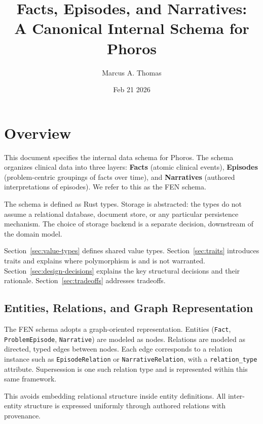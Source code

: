 \documentclass[11pt]{article}
\title{Facts, Episodes, and Narratives:\\
A Canonical Internal Schema for Phoros}
\author{Marcus A. Thomas}
\date{Feb 21 2026}
\begin{document}
\maketitle

\section{Overview}

This document specifies the internal data schema for Phoros. The schema
organizes clinical data into three layers: \textbf{Facts} (atomic clinical
events), \textbf{Episodes} (problem-centric groupings of facts over time),
and \textbf{Narratives} (authored interpretations of episodes). We refer to
this as the FEN schema.

The schema is defined as Rust types. Storage is abstracted: the types do not
assume a relational database, document store, or any particular persistence
mechanism. The choice of storage backend is a separate decision, downstream
of the domain model.

Section~\ref{sec:value-types}
defines shared value types. Section~\ref{sec:traits} introduces traits and
explains where polymorphism is and is not warranted.
Section~\ref{sec:design-decisions} explains the key structural decisions and
their rationale. Section~\ref{sec:tradeoffs} addresses tradeoffs.

\subsection{Entities, Relations, and Graph Representation}

The FEN schema adopts a graph-oriented representation. Entities (\texttt{Fact}, \texttt{ProblemEpisode}, \texttt{Narrative}) are
modeled as nodes. Relations are modeled as directed, typed edges
between nodes. Each edge corresponds to a relation instance such as
\texttt{EpisodeRelation} or \texttt{NarrativeRelation}, with a
\texttt{relation\_type} attribute. Supersession is one such relation
type and is represented within this same framework.

This avoids embedding relational structure inside entity definitions.
All inter-entity structure is expressed uniformly through authored
relations with provenance.
\end{document}
